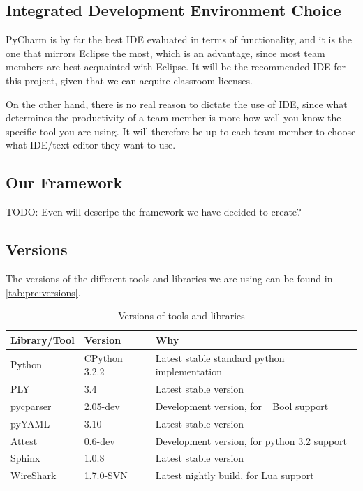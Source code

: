 \subsection{Integrated Development Environment Choice}
\label{sec:pre:idechoice}
PyCharm is by far the best IDE evaluated in terms of functionality, and it is
the one that mirrors Eclipse the most, which is an advantage, since most team
members are best acquainted with Eclipse. It will be the recommended IDE for
this project, given that we can acquire classroom licenses.

On the other hand, there is no real reason to dictate the use of IDE, since
what determines the productivity of a team member is more how well you know
the specific tool you are using. It will therefore be up to each team member
to choose what IDE/text editor they want to use.

\subsection{Our Framework}
\label{sec:pre:framework}
TODO: Even will descripe the framework we have decided to create?

\subsection{Versions}
\label{sec:pre:versions}
The versions of the different tools and libraries we are using can be found in
\autoref{tab:pre:versions}.
\begin{table}[!h] \footnotesize \center
\vspace{-10pt}
\caption{Versions of tools and libraries\label{tab:pre:versions}}
\begin{tabular}{l l l}
	\toprule
	Library/Tool & Version & Why \\
	\midrule
	Python & CPython 3.2.2 & Latest stable standard python implementation \\
	PLY & 3.4 & Latest stable version \\
	pycparser & 2.05-dev & Development version, for \_Bool support \\
	pyYAML & 3.10 & Latest stable version \\
	Attest & 0.6-dev & Development version, for python 3.2 support \\
	Sphinx & 1.0.8 & Latest stable version \\
	WireShark & 1.7.0-SVN & Latest nightly build, for Lua support \\
	\bottomrule
\end{tabular}
\vspace{-10pt}
\end{table}


